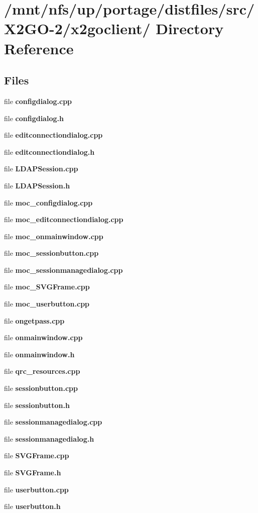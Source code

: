 \section{/mnt/nfs/up/portage/distfiles/src/X2GO-2/x2goclient/ Directory Reference}
\label{dir_e8e3c36ce07879a6370e028298928b0b}
\subsection*{Files}
\begin{CompactItemize}
\item 
file \textbf{configdialog.cpp}
\item 
file \textbf{configdialog.h}
\item 
file \textbf{editconnectiondialog.cpp}
\item 
file \textbf{editconnectiondialog.h}
\item 
file \textbf{LDAPSession.cpp}
\item 
file \textbf{LDAPSession.h}
\item 
file \textbf{moc\_\-configdialog.cpp}
\item 
file \textbf{moc\_\-editconnectiondialog.cpp}
\item 
file \textbf{moc\_\-onmainwindow.cpp}
\item 
file \textbf{moc\_\-sessionbutton.cpp}
\item 
file \textbf{moc\_\-sessionmanagedialog.cpp}
\item 
file \textbf{moc\_\-SVGFrame.cpp}
\item 
file \textbf{moc\_\-userbutton.cpp}
\item 
file \textbf{ongetpass.cpp}
\item 
file \textbf{onmainwindow.cpp}
\item 
file \textbf{onmainwindow.h}
\item 
file \textbf{qrc\_\-resources.cpp}
\item 
file \textbf{sessionbutton.cpp}
\item 
file \textbf{sessionbutton.h}
\item 
file \textbf{sessionmanagedialog.cpp}
\item 
file \textbf{sessionmanagedialog.h}
\item 
file \textbf{SVGFrame.cpp}
\item 
file \textbf{SVGFrame.h}
\item 
file \textbf{userbutton.cpp}
\item 
file \textbf{userbutton.h}
\end{CompactItemize}
